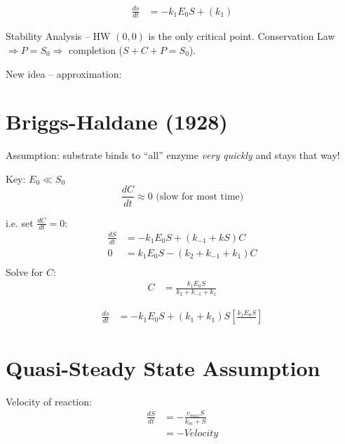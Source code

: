 \documentclass[
	date={October 28{,} 2024},
	month={10},
	day={28}
]{math486notes}
\begin{document}
\begin{equation*}
\begin{aligned}
	\frac{ds}{dt} &= -k_{1}E_{0}S + (k_{1})
\end{aligned}
\end{equation*}

Stability Analysis -- HW
$(0,0)$ is the only critical point.
Conservation Law $\Rightarrow P = S_{0} \Rightarrow $ completion ($S + C + P = S_{0}$).

New idea -- approximation:

\section{Briggs-Haldane (1928)}\label{sec:briggs-haldane-(1928)}
Assumption: substrate binds to ``all'' enzyme \emph{very quickly} and stays that way!

Key: $E_{0} \ll S_{0}$
\[ \frac{dC}{dt} \approx 0 \mbox{  (slow for most time)} \]

i.e. set $\frac{dC}{dt} = 0$:
\begin{equation*}
\begin{aligned}
	\frac{dS}{dt} &= -k_{1}E_{0}S + (k_{-1} + kS)C\\
	0 &= k_{1}E_{0}S - (k_{2} + k_{-1} + k_{1})C\\
\end{aligned}
\end{equation*}
Solve for $C$:
\begin{equation*}
\begin{aligned}
	C &= \frac{k_{1}E_{0}S}{k_{2} + k_{-1} + k_{1}}
\end{aligned}
\end{equation*}

\begin{equation*}
\begin{aligned}
	\frac{ds}{dt} &= -k_{1}E_{0}S + (k_{1} + k_{1})S \left[ \frac{k_{1}E_{0}S}{} \right]
\end{aligned}
\end{equation*}

\section{Quasi-Steady State Assumption}\label{sec:quasi-steady-state-assumption}
Velocity of reaction:
\begin{equation}
	\begin{aligned}
		\frac{dS}{dt} &= -\frac{v_{max}S}{k_{m} + S}\\
		&= -Velocity
	\end{aligned}
	\label{eq:velocity-of-reaction}
\end{equation}
\end{document}

